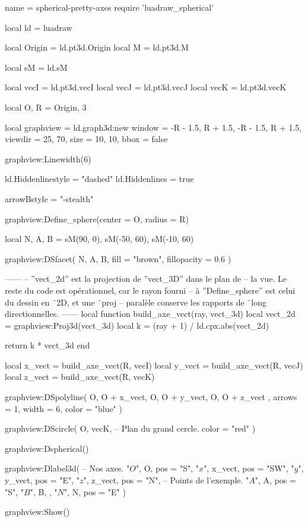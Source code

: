 \documentclass[border = 3pt]{standalone}
\begin{document}
\begin{luadraw*}{name = spherical-pretty-axes}
require 'luadraw_spherical'

local ld = luadraw

local Origin = ld.pt3d.Origin
local M      = ld.pt3d.M

local sM = ld.sM

local vecI = ld.pt3d.vecI
local vecJ = ld.pt3d.vecJ
local vecK = ld.pt3d.vecK

local O, R = Origin, 3

local graphview = ld.graph3d:new{
  window  = {-R - 1.5, R + 1.5, -R - 1.5, R + 1.5},
  viewdir = {25, 70},
  size    = {10, 10},
  bbox    = false
}

graphview:Linewidth(6)

ld.Hiddenlinestyle = "dashed"
ld.Hiddenlines     = true

arrowBstyle = "-stealth"

graphview:Define_sphere({center = O, radius = R})

local N, A, B = sM(90, 0), sM(-50, 60), sM(-10, 60)

graphview:DSfacet(
  {N, A, B},
  {fill = "brown", fillopacity = 0.6}
)

------
-- ''vect_2d'' est la projection de ''vect_3D'' dans le plan de
-- la vue. Le reste du code est opérationnel, car le rayon fourni
-- à ''Define_sphere'' est celui du dessin en ¨2D, et une ¨proj
-- paralèle conserve les rapports de ¨long directionnelles.
------
local function build_axe_vect(ray, vect_3d)
  local vect_2d = graphview:Proj3d(vect_3d)
  local k       = (ray + 1) / ld.cpx.abs(vect_2d)

  return k * vect_3d
end

local x_vect = build_axe_vect(R, vecI)
local y_vect = build_axe_vect(R, vecJ)
local z_vect = build_axe_vect(R, vecK)

graphview:DSpolyline(
  {
    {O, O + x_vect},
    {O, O + y_vect},
    {O, O + z_vect}
  },
  {arrows = 1, width = 6, color = "blue"}
)

graphview:DScircle(
  {O, vecK},       -- Plan du grand cercle.
  {color = "red"}
)

graphview:Dspherical()

graphview:Dlabel3d(
-- Nos axes.
  "$O$", O, {pos = "S"},
  "$x$", x_vect, {pos = "SW"},
  "$y$", y_vect, {pos = "E"},
  "$z$", z_vect, {pos = "N"},
-- Points de l'exemple.
  "$A$", A, {pos = "S"},
  "$B$", B, {},
  "$N$", N, {pos = "E"}
)

graphview:Show()
\end{luadraw*}
\end{document}
